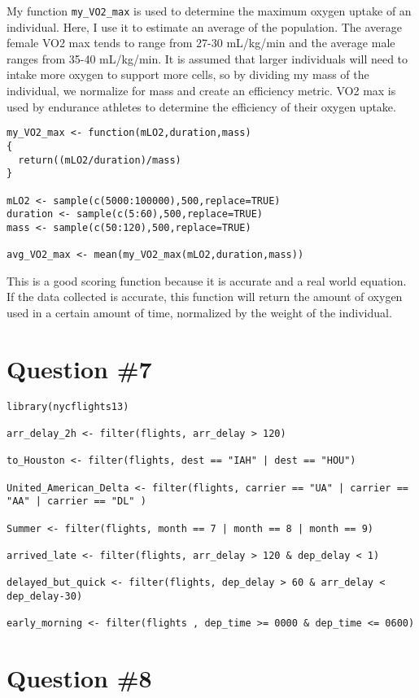 \documentclass[]{article}
\begin{document}
My function \texttt{my\_VO2\_max} is used to determine the maximum
oxygen uptake of an individual. Here, I use it to estimate an average of
the population. The average female VO2 max tends to range from 27-30
mL/kg/min and the average male ranges from 35-40 mL/kg/min. It is
assumed that larger individuals will need to intake more oxygen to
support more cells, so by dividing my mass of the individual, we
normalize for mass and create an efficiency metric. VO2 max is used by
endurance athletes to determine the efficiency of their oxygen uptake.

\begin{verbatim}
my_VO2_max <- function(mLO2,duration,mass)
{
  return((mLO2/duration)/mass)
}

mLO2 <- sample(c(5000:100000),500,replace=TRUE)
duration <- sample(c(5:60),500,replace=TRUE)
mass <- sample(c(50:120),500,replace=TRUE)

avg_VO2_max <- mean(my_VO2_max(mLO2,duration,mass))
\end{verbatim}

This is a good scoring function because it is accurate and a real world
equation. If the data collected is accurate, this function will return
the amount of oxygen used in a certain amount of time, normalized by the
weight of the individual.

\section{Question \#7}\label{question-7}

\begin{verbatim}
library(nycflights13)

arr_delay_2h <- filter(flights, arr_delay > 120)

to_Houston <- filter(flights, dest == "IAH" | dest == "HOU")

United_American_Delta <- filter(flights, carrier == "UA" | carrier == "AA" | carrier == "DL" )

Summer <- filter(flights, month == 7 | month == 8 | month == 9)

arrived_late <- filter(flights, arr_delay > 120 & dep_delay < 1)

delayed_but_quick <- filter(flights, dep_delay > 60 & arr_delay < dep_delay-30)

early_morning <- filter(flights , dep_time >= 0000 & dep_time <= 0600)
\end{verbatim}

\section{Question \#8}\label{question-8}
\end{document}
